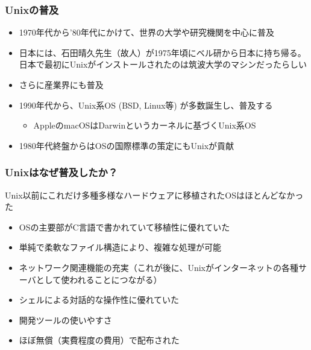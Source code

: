 \documentclass[dvipdfmx]{beamer}
\begin{document}
\begin{frame}
    \frametitle{Unixの普及}
    \begin{itemize}
        \item 1970年代から'80年代にかけて、世界の大学や研究機関を中心に普及
        \item 日本には、石田晴久先生（故人）が1975年頃にベル研から日本に持ち帰る。日本で最初にUnixがインストールされたのは筑波大学のマシンだったらしい \cite{sunahara-murai}
        \item さらに産業界にも普及
        \item 1990年代から、Unix系OS (BSD, Linux等) が多数誕生し、普及する
        \begin{itemize}
            \item AppleのmacOSはDarwinというカーネルに基づくUnix系OS
        \end{itemize}
        \item 1980年代終盤からはOSの国際標準の策定にもUnixが貢献
    \end{itemize}
\end{frame}

\begin{frame}
    \frametitle{Unixはなぜ普及したか？}

    \begin{block}{Unix以前にこれだけ多種多様なハードウェアに移植されたOSはほとんどなかった}
        \begin{itemize}
            \item OSの主要部がC言語で書かれていて移植性に優れていた
            \item 単純で柔軟なファイル構造により、複雑な処理が可能
            \item ネットワーク関連機能の充実（これが後に、Unixがインターネットの各種サーバとして使われることにつながる）
            \item シェルによる対話的な操作性に優れていた
            \item 開発ツールの使いやすさ
            \item ほぼ無償（実費程度の費用）で配布された
        \end{itemize}
    \end{block}
\end{frame}
\end{document}

